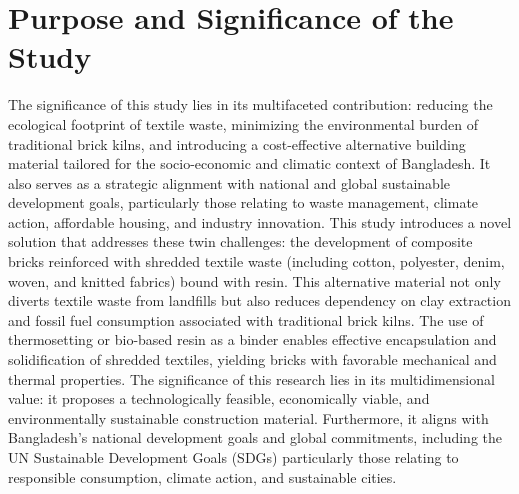 \section{Purpose and Significance of the Study}
The significance of this study lies in its multifaceted contribution: reducing the ecological footprint of textile waste, minimizing the environmental burden of traditional brick kilns, and introducing a cost-effective alternative building material tailored for the socio-economic and climatic context of Bangladesh. It also serves as a strategic alignment with national and global sustainable development goals, particularly those relating to waste management, climate action, affordable housing, and industry innovation. This study introduces a novel solution that addresses these twin challenges: the development of composite bricks reinforced with shredded textile waste (including cotton, polyester, denim, woven, and knitted fabrics) bound with resin. This alternative material not only diverts textile waste from landfills but also reduces dependency on clay extraction and fossil fuel consumption associated with traditional brick kilns. The use of thermosetting or bio-based resin as a binder enables effective encapsulation and solidification of shredded textiles, yielding bricks with favorable mechanical and thermal properties. The significance of this research lies in its multidimensional value: it proposes a technologically feasible, economically viable, and environmentally sustainable construction material. Furthermore, it aligns with Bangladesh's national development goals and global commitments, including the UN Sustainable Development Goals (SDGs) particularly those relating to responsible consumption, climate action, and sustainable cities.